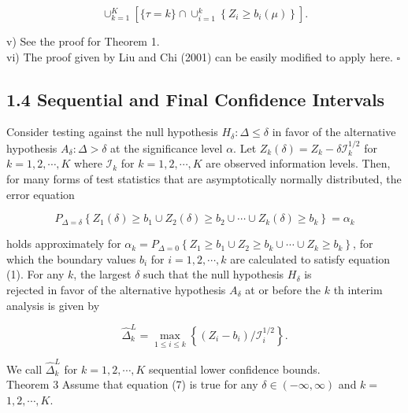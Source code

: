 \documentclass[10pt]{article}
\begin{document}
$$
\cup_{k=1}^{K}\left[\{\tau=k\} \cap \cup_{i=1}^{k}\left\{Z_{i} \geq b_{i}(\mu)\right\}\right] .
$$

v) See the proof for Theorem 1.\\
vi) The proof given by Liu and Chi (2001) can be easily modified to apply here. \(\square\)

\subsection*{1.4 Sequential and Final Confidence Intervals}
Consider testing against the null hypothesis $H_{\delta}: \Delta \leq \delta$ in favor of the alternative hypothesis $A_{\delta}: \Delta>\delta$ at the significance level $\alpha$. Let $Z_{k}(\delta)=Z_{k}-\delta \mathcal{I}_{k}^{1 / 2}$ for $k=1,2, \cdots, K$ where $\mathcal{I}_{k}$ for $k=1,2, \cdots, K$ are observed information levels. Then, for many forms of test statistics that are asymptotically normally distributed, the error equation


\begin{equation*}
P_{\Delta=\delta}\left\{Z_{1}(\delta) \geq b_{1} \cup Z_{2}(\delta) \geq b_{2} \cup \cdots \cup Z_{k}(\delta) \geq b_{k}\right\}=\alpha_{k} \tag{7}
\end{equation*}


holds approximately for $\alpha_{k}=P_{\Delta=0}\left\{Z_{1} \geq b_{1} \cup Z_{2} \geq b_{k} \cup \cdots \cup Z_{k} \geq b_{k}\right\}$, for which the boundary values $b_{i}$ for $i=1,2, \cdots, k$ are calculated to satisfy equation (1). For any $k$, the largest $\delta$ such that the null hypothesis $H_{\delta}$ is\\
rejected in favor of the alternative hypothesis $A_{\delta}$ at or before the $k$ th interim analysis is given by


\begin{equation*}
\hat{\Delta}_{k}^{L}=\max _{1 \leq i \leq k}\left\{\left(Z_{i}-b_{i}\right) / \mathcal{I}_{i}^{1 / 2}\right\} . \tag{8}
\end{equation*}


We call $\hat{\Delta}_{k}^{L}$ for $k=1,2, \cdots, K$ sequential lower confidence bounds.\\
Theorem 3 Assume that equation (7) is true for any $\delta \in(-\infty, \infty)$ and $k=$ $1,2, \cdots, K$.
\end{document}

